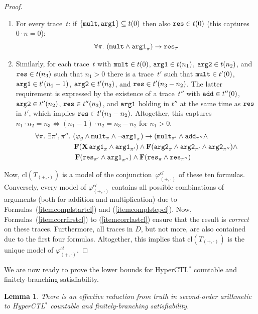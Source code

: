 \documentclass[dvipsnames,10pt,a4paper]{amsart}
\newtheorem{lem}[thm]{Lemma}
\theoremstyle{definition}
\theoremstyle{remark}
\newcommand{\set}[1]{\{#1\}}
\renewcommand{\phi}{\varphi}
\newcommand{\F}{\mathop{\mathbf{F}\vphantom{a}}\nolimits}
\newcommand{\X}{\mathop{\mathbf{X}\vphantom{a}}\nolimits}
\newcommand{\hyctlstar}{{HyperCTL$^*$}\xspace}
\newcommand\argl{\textup{\texttt{arg1}}}
\newcommand\argr{\textup{\texttt{arg2}}}
\newcommand\res{\textup{\texttt{res}}}
\newcommand\add{\textup{\texttt{add}}}
\newcommand\mult{\textup{\texttt{mult}}}
\newcommand\phiop{\varphi_{({+},{\cdot})}}
\newcommand\Top{T_{({+},{\cdot})}}
\renewcommand{\phi}{\varphi}
\newcommand{\closure}[1]{\mathrm{cl}(#1)}
\newcommand{\phiopc}{\phiop^{cl}}
\newcommand{\diff}{D}
\begin{document}
\begin{proof}
\begin{enumerate}
        \item For every trace~$t$: if $\set{\mult,\argl} \subseteq t(0)$ then also $\res \in t(0)$ (this captures $0 \cdot n = 0$):
	\[
	\forall \pi.\ (\mult\wedge \argl_\pi ) \rightarrow  \res_\pi
	\]
	\item\label{itemcorrlastcl} Similarly, for each trace~$t$ with $\mult \in t(0)$, $\argl \in t(n_1)$,
    $\argr \in t(n_2)$, and $\res \in t(n_3)$ such that $n_1 > 0$ there is a trace~$t'$ such that $\mult \in t'(0)$, $\argl \in t'(n_1-1)$,
    $\argr \in t'(n_2)$, and $\res \in t'(n_3-n_2)$.
   The latter requirement is expressed by the existence of a trace~$t''$ with $\add\in t''(0)$, $\argr \in t''(n_2)$, $\res \in t''(n_3)$, and $\argl$ holding in $t''$ at the same time as $\res$ in $t'$, which implies $\res \in t'(n_3-n_2)$. Altogether, this captures $n_1 \cdot n_2 = n_3 \Leftrightarrow (n_1-1) \cdot n_2 = n_3-n_2$ for $n_1 > 0$.
    \begin{align*}
    \forall \pi.\ \exists\pi',\pi''.\ &(\phi_g\wedge\mult_\pi \wedge  \neg \argl_\pi) \rightarrow   \left(\mult_{\pi'} \wedge \add_{\pi''} \wedge\right.  \\ 
&    
    \F(\X\argl_{\pi} \wedge \argl_{\pi'} ) \wedge 
    \F(\argr_\pi \wedge \argr_{\pi'} \wedge \argr_{\pi''}) \wedge \\ 
&  \left.    \F(\res_{\pi'} \wedge \argl_{\pi''}) \wedge 
  \F(\res_{\pi} \wedge \res_{\pi''}
    \right)
    \end{align*}
\end{enumerate}

Now, $\closure{\Top}$ is a model of the conjunction~$\phiopc$ of these ten formulas. Conversely, every model of $\phiopc$ contains all possible combinations of arguments (both for addition and multiplication) due to Formulas~(\ref{itemcomplstartcl}) and (\ref{itemcomplstepcl}).
Now, Formulas~(\ref{itemcorrfirstcl}) to (\ref{itemcorrlastcl}) ensure that the result is \emph{correct} on these traces.
Furthermore, all traces in $\diff$, but not more, are also contained due to the first four formulas. 
 Altogether, this implies that $\closure{\Top}$ is the unique model of $\phiopc$.
\end{proof}


We are now ready to prove the lower bounds for \hyctlstar countable and
finitely-branching satisfiability.


\begin{lem}\label{lem:hyctlvars:rev}
  There is an effective reduction from truth in second-order arithmetic to
  \hyctlstar countable and finitely-branching satisfiability.
\end{lem}
\end{document}
